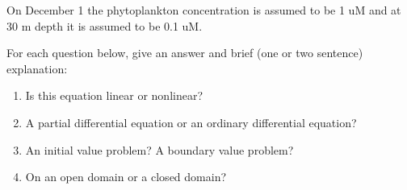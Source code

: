 \documentclass[12pt]{article}
\begin{document}
\begin{enumerate}
On December 1 the phytoplankton concentration is assumed to be 1 uM and at 30 m depth it is assumed to be 0.1 uM.

For each question below, give an answer and brief (one or two sentence) explanation:
\begin{enumerate}
\item Is this equation linear or nonlinear?\\[48pt]
\item A partial differential equation or an ordinary differential equation?\\[48pt]
\item An initial value problem? A boundary value problem?\\[48pt]
\item On an open domain or a closed domain?\\[48pt]
\end{enumerate}
\end{enumerate}
\end{document}
